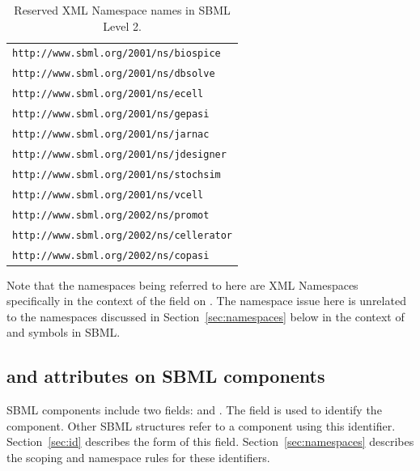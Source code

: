 \documentclass[10pt]{cekarticle}
\begin{document}
\begin{table}[b]
  \vspace*{5pt}
  \centering
  \begin{tabular}{l}
    \toprule
    \texttt{http://www.sbml.org/2001/ns/biospice}\\
    \texttt{http://www.sbml.org/2001/ns/dbsolve}\\
    \texttt{http://www.sbml.org/2001/ns/ecell}\\
    \texttt{http://www.sbml.org/2001/ns/gepasi}\\
    \texttt{http://www.sbml.org/2001/ns/jarnac}\\
    \texttt{http://www.sbml.org/2001/ns/jdesigner}\\
    \texttt{http://www.sbml.org/2001/ns/stochsim}\\
    \texttt{http://www.sbml.org/2001/ns/vcell}\\
    \texttt{http://www.sbml.org/2002/ns/promot}\\
    \texttt{http://www.sbml.org/2002/ns/cellerator}\\
    \texttt{http://www.sbml.org/2002/ns/copasi}\\
    \bottomrule
  \end{tabular}
  \caption{Reserved XML Namespace names in SBML Level 2.}
  \label{tab:reserved-urls}
\end{table}

Note that the namespaces being referred to here are XML Namespaces
specifically in the context of the  field on
.  The namespace issue here is unrelated to the namespaces
discussed in Section~\ref{sec:namespaces} below in the context of
 and symbols in SBML.

\subsection{ and  attributes on SBML components}

\label{sec:idnameattribs}

SBML components include two fields:  and .
The  field is used to identify the component.  Other
SBML structures refer to a component using this identifier.
Section~\ref{sec:id} describes the form of this field.
Section~\ref{sec:namespaces} describes the scoping and namespace
rules for these identifiers.
\end{document}
